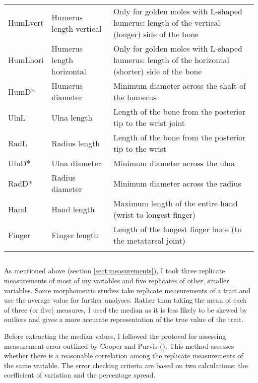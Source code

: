 \begin{center}
\begin{longtable} {p{} p{} p{}}
HumLvert & Humerus length vertical & Only for golden moles with L-shaped humerus: length of the vertical (longer) side of the bone\\
HumLhori & Humerus length horizontal & Only for golden moles with L-shaped humerus: length of the horizontal (shorter) side of the bone\\
HumD* & Humerus diameter & Minimum diameter across the shaft of the humerus\\
UlnL & Ulna length & Length of the bone from the posterior tip to the wrist joint\\
RadL & Radius length & Length of the bone from the posterior tip to the wrist\\
UlnD* & Ulna diameter & Minimum diameter across the ulna\\
RadD* & Radius diameter & Minimum diameter across the radius\\
Hand & Hand length & Maximum length of the entire hand (wrist to longest finger)\\
Finger & Finger length & Length of the longest finger bone (to the metatarsal joint)\\
\hline
\label{tab:limb.measurements}
\end{longtable}
\end{center}
\newpage
\subsection{}
	
	As mentioned above (section \ref{sect:measurements}), I took three replicate measurements of most of my variables and five replicates of other, smaller variables. 
	Some morphometric studies take replicate measurements of a trait and use the average value for further analyses. Rather than taking the mean of each of three (or five) measures, I used the median as it is less likely to be skewed by outliers and gives a more accurate representation of the true value of the trait.
	
	Before extracting the median values, I followed the protocol for assessing measurement error outlined by  Cooper and Purvis (\citeyear{Cooper2009}). This method assesses whether there is a reasonable correlation among the replicate measurements of the same variable. The error checking criteria are based on two calculations: the coefficient of variation and the percentage spread.
	
